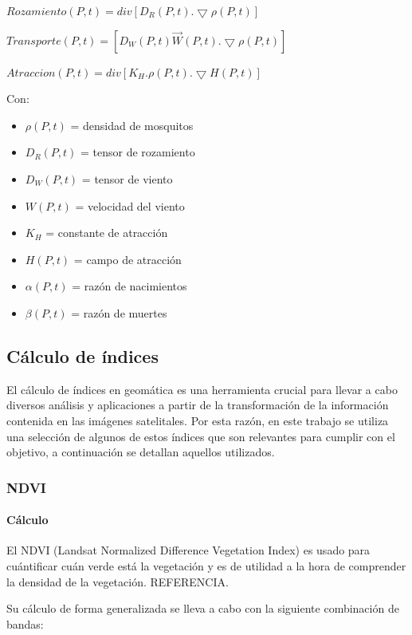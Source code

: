 $Rozamiento(P,t)=div[D_R (P,t) . \bigtriangledown \rho (P,t)]$

$Transporte(P,t)=[D_W (P,t) \vec{W} (P,t) . \bigtriangledown \rho (P,t)]$

$Atraccion(P,t) = div[K_H . \rho (P,t) . \bigtriangledown H (P,t)]$

\singlespacing

Con:

\begin{itemize}
	\item $\rho (P,t)$ = densidad de mosquitos
	\item $D_R (P,t)$ = tensor de rozamiento
	\item $D_W (P,t)$ = tensor de viento
	\item $W (P,t)$ = velocidad del viento
	\item $K_H$ = constante de atracción
	\item $H(P,t)$ = campo de atracción
	\item $\alpha (P,t)$ = razón de nacimientos
	\item $\beta (P,t)$ = razón de muertes
\end{itemize}

\subsection{Cálculo de índices}

El cálculo de índices en geomática es una herramienta crucial para llevar a cabo diversos análisis y aplicaciones a partir de la transformación de la información contenida en las imágenes satelitales. Por esta razón, en este trabajo se utiliza una selección de algunos de estos índices que son relevantes para cumplir con el objetivo, a continuación se detallan aquellos utilizados.

\subsubsection{NDVI} \label{ndvi}

\paragraph{Cálculo}

El NDVI (Landsat Normalized Difference Vegetation Index) es usado para cuántificar cuán verde está la vegetación y es de utilidad a la hora de comprender la densidad de la vegetación. REFERENCIA.

Su cálculo de forma generalizada se lleva a cabo con la siguiente combinación de bandas:

